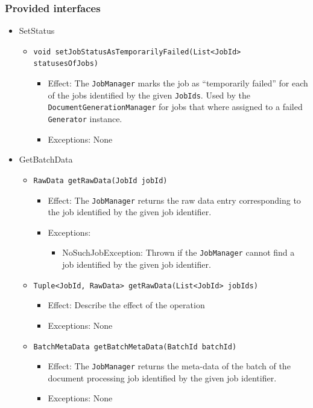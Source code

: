 \documentclass[a4paper,10pt]{article}
\begin{document}
\subsubsection*{Provided interfaces}
\begin{itemize}
    \item SetStatus
    \begin{itemize}
        \item \texttt{void setJobStatusAsTemporarilyFailed(List<JobId> statusesOfJobs)}
        \begin{itemize}
            \item Effect: The \texttt{JobManager} marks the job as ``temporarily failed'' for each of the jobs identified by the given \texttt{JobIds}. Used by the \texttt{DocumentGenerationManager} for jobs that where assigned to a failed \texttt{Generator} instance.
            \item Exceptions: None
        \end{itemize}
    \end{itemize}
    
	\item GetBatchData
    \begin{itemize}
        \item \texttt{RawData getRawData(JobId jobId)}
        \begin{itemize}
            \item Effect: The \texttt{JobManager} returns the raw data entry corresponding to the job identified by the given job identifier.
            \item Exceptions:
            \begin{itemize}
            	\item NoSuchJobException: Thrown if the \texttt{JobManager} cannot find a job identified by the given job identifier.
            \end{itemize}
        \end{itemize}    
    
        \item \texttt{Tuple<JobId, RawData> getRawData(List<JobId> jobIds)}
        \begin{itemize}
            \item Effect: Describe the effect of the operation
            \item Exceptions: None
        \end{itemize}
        \item \texttt{BatchMetaData getBatchMetaData(BatchId batchId)}
        \begin{itemize}
            \item Effect: The \texttt{JobManager} returns the meta-data of the batch of the document processing job identified by the given job identifier.
            \item Exceptions: None
        \end{itemize}
        

\end{itemize}
\end{itemize}
\end{document}
